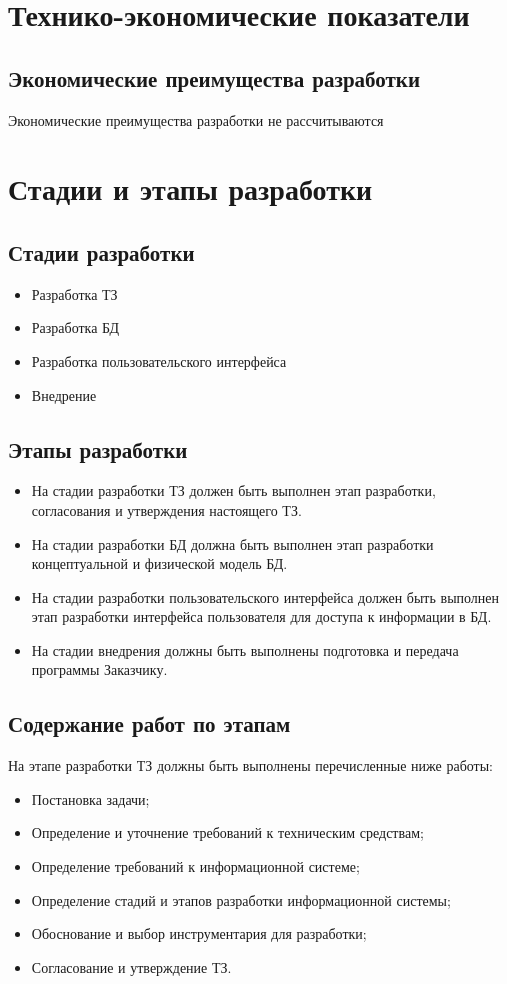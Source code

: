 \section{Технико-экономические показатели}
  \subsection{Экономические преимущества разработки}
    Экономические преимущества разработки не рассчитываются 
\section{Стадии и этапы разработки}
  \subsection{Стадии разработки}
   \begin{itemize}
    \item Разработка ТЗ
    \item Разработка БД
    \item Разработка пользовательского интерфейса
    \item Внедрение
  \end{itemize}
  \subsection{Этапы разработки}
  \begin{itemize}
    \item На стадии разработки ТЗ должен быть выполнен этап разработки, согласования и утверждения настоящего ТЗ.
    \item На стадии разработки БД должна быть выполнен этап разработки концептуальной и физической модель БД.
    \item На стадии разработки пользовательского интерфейса должен быть выполнен этап разработки интерфейса пользователя для доступа к информации в БД.
    \item На стадии внедрения должны быть выполнены подготовка и передача программы Заказчику.
  \end{itemize}
  
  \subsection{Содержание работ по этапам}
    На этапе разработки ТЗ должны быть выполнены перечисленные ниже работы:
      \begin{itemize}
        \item Постановка задачи;
        \item Определение и уточнение требований к техническим средствам;
        \item Определение требований к информационной системе;
        \item Определение стадий и этапов разработки информационной системы;
        \item Обоснование и выбор инструментария для разработки;
        \item Согласование и утверждение ТЗ.
      \end{itemize}
        
